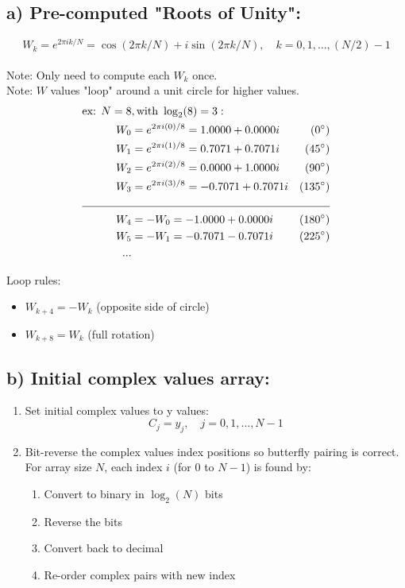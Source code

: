 \documentclass[12pt]{article}
\begin{document}
\subsection*{a) Pre-computed "Roots of Unity":}
\[W_k = e^{2\pi ik/N} = \cos(2\pi k/N) + i\sin(2\pi k/N), \quad k=0,1,\ldots,(N/2)-1\]
\\
Note: Only need to compute each $W_k$ once.\\
Note: $W$ values "loop" around a unit circle for higher values.\\
\begin{align*}
\text{ex: } N=8&, \text{with } \log_2(8)= 3: \\
W_0 &= e^{2\pi i(0)/8} = 1.0000+0.0000i &(0^\circ)\\
W_1 &= e^{2\pi i(1)/8} = 0.7071+0.7071i &(45^\circ)\\
W_2 &= e^{2\pi i(2)/8} = 0.0000+1.0000i &(90^\circ)\\
W_3 &= e^{2\pi i(3)/8} = -0.7071+0.7071i &(135^\circ)\\ 
\cline{1-3}
W_4 &= -W_0 = -1.0000+0.0000i &(180^\circ)\\
W_5 &= -W_1 = -0.7071-0.7071i &(225^\circ)\\
...
\end{align*}

Loop rules:
\begin{itemize}
    \item $W_{k+4} = -W_k$ (opposite side of circle)
    \item $W_{k+8} = W_k$ (full rotation)
\end{itemize}

\subsection*{b) Initial complex values array:}
\begin{enumerate}[label=\roman*)]
    \item Set initial complex values to y values:
    \[C_j = y_j, \quad j=0,1,\ldots,N-1\]
    \item Bit-reverse the complex values index positions so butterfly pairing is correct.\\
    For array size $N$, each index $i$ (for 0 to $N-1$) is found by:
    \begin{enumerate}
        \item Convert to binary in $\log_2(N)$ bits
        \item Reverse the bits
        \item Convert back to decimal
        \item Re-order complex pairs with new index
    \end{enumerate}
\end{enumerate}
\end{document}
